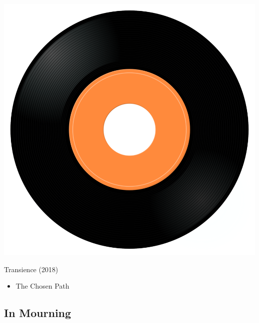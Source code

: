 \begin{minipage}[t]{0.25\textwidth}\vspace{0pt}
\captionsetup{type=figure}
\includegraphics[width=\textwidth]{Images/cover.png}
\caption*{Transience (2018)}
\end{minipage}
\begin{minipage}[t]{0.25\textwidth}\vspace{0pt}
\begin{itemize}[nosep,leftmargin=1em,labelwidth=*,align=left]
	\setlength{\itemsep}{0pt}
	\item The Chosen Path
\end{itemize}
\end{minipage}

\subsection{In Mourning}

